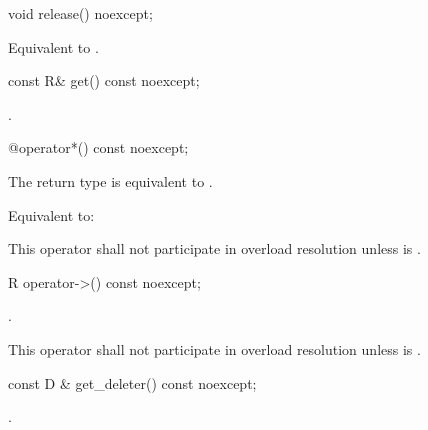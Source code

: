 \documentclass[ebook,11pt,article]{memoir}
\begin{document}
\begin{itemdecl}
void release() noexcept;
\end{itemdecl}

\begin{itemdescr}
\pnum
\effects 
Equivalent to .
\end{itemdescr}


\begin{itemdecl}
const R& get() const noexcept;
\end{itemdecl}

\begin{itemdescr}
\pnum
\returns
{}. %
\end{itemdescr}


\begin{itemdecl}
@\seebelow@ operator*() const noexcept;
\end{itemdecl}

\begin{itemdescr}

\pnum
\requires
The return type is equivalent to 
. 

\pnum
\effects 
Equivalent to:\\

\pnum
\remarks 
This operator shall not participate in overload resolution unless  is .
\end{itemdescr}

\begin{itemdecl}
R operator->() const noexcept;
\end{itemdecl}

\begin{itemdescr}
\pnum
\pnum
\returns {}.

\remarks 
This operator 
shall not participate in overload resolution unless 
is . 
\end{itemdescr}



\begin{itemdecl}
const D & get_deleter() const noexcept;
\end{itemdecl}

\begin{itemdescr}
\pnum
\returns {}.
\end{itemdescr}
\end{document}
